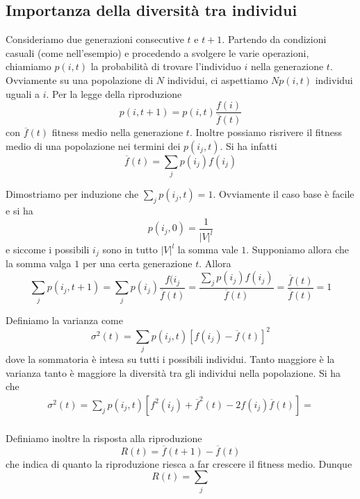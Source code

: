 \documentclass[a4paper, 11pt]{article}
\begin{document}
\subsection{Importanza della diversit\`a tra individui}

Consideriamo due generazioni consecutive $t$ e $t+1$. Partendo da condizioni
casuali (come nell'esempio) e procedendo a svolgere le varie operazioni,
chiamiamo $p(i,t)$ la probabilit\`a di trovare l'individuo $i$ nella
generazione $t$. Ovviamente su una popolazione di $N$ individui, ci aspettiamo
$Np(i,t)$ individui uguali a $i$. Per la legge della riproduzione
$$p(i, t+1) = p(i,t) \frac{f(i)}{\overline{f}(t)}$$
con $\overline{f}(t)$ fitness medio nella generazione $t$. Inoltre possiamo
risrivere il fitness medio di una popolazione nei termini dei $p(i_j,t)$. Si ha
infatti
$$\overline{f}(t)=\sum\limits_j p(i_j)f(i_j)$$


Dimostriamo per induzione che $\sum_j p(i_j, t)=1$. Ovviamente il caso base \`e
facile e si ha 
$$p(i_j,0)=\frac{1}{|V|^l}$$
e siccome i possibili $i_j$ sono in tutto $|V|^l$ la somma vale $1$.
Supponiamo allora che la somma valga $1$ per una certa generazione $t$. Allora
$$\sum\limits_j p(i_j,t+1) = 
\sum\limits_j p(i_j)\frac{f(i_j}{\overline{f}(t)} = 
\frac{\sum\limits_j p(i_j)f(i_j)}{\overline{f}(t)}=
\frac{\overline{f}(t)}{\overline{f}(t)}=1$$

Definiamo la varianza come 
$$\sigma^2(t) = \sum\limits_j p(i_j, t) \left[f(i_j)- \overline{f}(t)\right]^2$$
dove la sommatoria \`e intesa su tutti i possibili individui. Tanto maggiore \`e
la varianza tanto \`e maggiore la diversit\`a tra gli individui nella
popolazione. Si ha che 
\begin{align*}
\sigma^2(t)=
    \sum\limits_j p(i_j,t)\left[f^2(i_j) +
    \overline{f}^2(t)-2f(i_j)\overline{f}(t)\right]=\\
\end{align*}


Definiamo inoltre la risposta alla riproduzione
$$R(t) = \overline{f}(t+1)-\overline{f}(t)$$
che indica di quanto la riproduzione riesca a far crescere il fitness medio.
Dunque
$$R(t)=
\sum\limits_j$$
\end{document}
